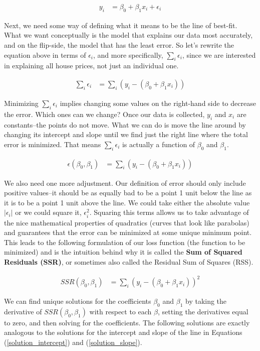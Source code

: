 \documentclass[10pt]{article}\usepackage[]{graphicx}\usepackage[]{color}
\begin{document}
\begin{align}
y_i &= \beta_0 + \beta_1 x_i + \epsilon_i
\end{align}

Next, we need some way of defining what it means to be the line of best-fit. What we want conceptually is the model that explains our data most accurately, and on the flip-side, the model that has the least error. So let's rewrite the equation above in terms of $\epsilon_i$, and more specifically, $\sum_i \epsilon_i$, since we are interested in explaining all house prices, not just an individual one.

\begin{align}
\sum_i \epsilon_i &= \sum_i ( y_i -  (\beta_0 + \beta_1 x_i) )
\end{align}

Minimizing $\sum_i \epsilon_i$ implies changing some values on the right-hand side to decrease the error. Which ones can we change? Once our data is collected, $y_i$ and $x_i$ are constants--the points do not move. What we can do is move the line around by changing its intercept and slope until we find just the right line where the total error is minimized. That means $\sum_i \epsilon_i$ is actually a function of $\beta_0$ and $\beta_1$.

\begin{align}
\epsilon(\beta_0, \beta_1) &= \sum_i ( y_i -  (\beta_0 + \beta_1 x_i) )
\end{align}

We also need one more adjustment. Our definition of error should only include positive values--it should be as equally bad to be a point 1 unit below the line as it is to be a point 1 unit above the line. We could take either the absolute value $|\epsilon_i|$ or we could square it, $\epsilon_i^2$. Squaring this terms allows us to take advantage of the nice mathematical properties of quadratics (curves that look like parabolas) and guarantees that the error can be minimized at some unique minimum point. This leads to the following formulation of our loss function (the function to be minimized) and is the intuition behind why it is called the \textbf{Sum of Squared Residuals (SSR)}, or sometimes also called the Residual Sum of Squares (RSS).

\begin{align}
SSR(\beta_0, \beta_1) &= \sum_i ( y_i -  (\beta_0 + \beta_1 x_i) )^2
\end{align}

We can find unique solutions for the coefficients $\beta_0$ and $\beta_1$ by taking the derivative of $SSR(\beta_0, \beta_1)$ with respect to each $\beta$, setting the derivatives equal to zero, and then solving for the coefficients. The following solutions are exactly analogous to the solutions for the intercept and slope of the line in Equations (\ref{solution_intercept}) and (\ref{solution_slope}).
\end{document}
